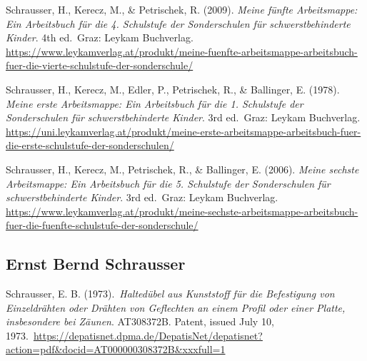\documentclass[
]{article}
\begin{document}
Schrausser, H., Kerecz, M., \& Petrischek, R. (2009). \emph{Meine fünfte
Arbeitsmappe: Ein Arbeitsbuch für die 4. Schulstufe der Sonderschulen
für schwerstbehinderte Kinder}. 4th ed.~Graz: Leykam Buchverlag.
\url{https://www.leykamverlag.at/produkt/meine-fuenfte-arbeitsmappe-arbeitsbuch-fuer-die-vierte-schulstufe-der-sonderschule/}

Schrausser, H., Kerecz, M., Edler, P., Petrischek, R., \& Ballinger, E.
(1978). \emph{Meine erste Arbeitsmappe: Ein Arbeitsbuch für die 1.
Schulstufe der Sonderschulen für schwerstbehinderte Kinder}. 3rd
ed.~Graz: Leykam Buchverlag.
\url{https://uni.leykamverlag.at/produkt/meine-erste-arbeitsmappe-arbeitsbuch-fuer-die-erste-schulstufe-der-sonderschulen/}

Schrausser, H., Kerecz, M., Petrischek, R., \& Ballinger, E. (2006).
\emph{Meine sechste Arbeitsmappe: Ein Arbeitsbuch für die 5. Schulstufe
der Sonderschulen für schwerstbehinderte Kinder}. 3rd ed.~Graz: Leykam
Buchverlag.
\url{https://www.leykamverlag.at/produkt/meine-sechste-arbeitsmappe-arbeitsbuch-fuer-die-fuenfte-schulstufe-der-sonderschule/}

\hypertarget{ernst-bernd-schrausser}{%
\subsection{Ernst Bernd Schrausser}\label{ernst-bernd-schrausser}}

Schrausser, E. B. (1973).~\emph{Haltedübel aus Kunststoff für die
Befestigung von Einzeldrähten oder Drähten von Geflechten an einem
Profil oder einer Platte, insbesondere bei Zäunen}. AT308372B. Patent,
issued July 10,
1973.~\url{https://depatisnet.dpma.de/DepatisNet/depatisnet?action=pdf\&docid=AT000000308372B\&xxxfull=1}
\end{document}

